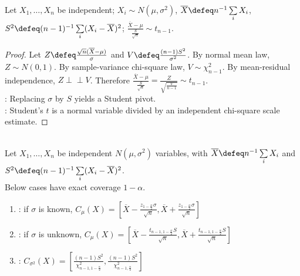 \begin{corollary} \label{cor:normal-student-t-pivot} \\
Let $X_1,\ldots,X_n$ be independent; $X_i\sim N(\mu,\sigma^2)$, $\overline{X}\defeq n^{-1}\sum\limits_iX_i$, $S^2\defeq(n-1)^{-1}\sum\limits_i(X_i-\overline{X})^2$; $\frac{\overline{X}-\mu}{\frac{S}{\sqrt n}}\sim t_{n-1}$.
\begin{proof} Let $Z\defeq\frac{\sqrt n(\overline{X}-\mu)}{\sigma}$ and $V\defeq\frac{(n-1)S^2}{\sigma^2}$. By normal mean law, $Z\sim N(0,1)$. By sample-variance chi-square law, $V\sim\chi^2_{n-1}$. By mean-residual independence, $Z\perp\!\!\!\perp V$. Therefore $\frac{\overline{X}-\mu}{\frac{S}{\sqrt n}}=\frac{Z}{\sqrt{\frac{V}{n-1}}}\sim t_{n-1}$.\\
: Replacing $\sigma$ by $S$ yields a Student pivot.\\
: Student's $t$ is a normal variable divided by an independent chi-square scale estimate.
\end{proof}
\end{corollary}

\begin{method} \label{meth:normal-mean-exact-confidence-intervals} \\
Let $X_1,\ldots,X_n$ be independent $N(\mu,\sigma^2)$ variables, with $\overline{X}\defeq n^{-1}\sum\limits_iX_i$ and $S^2\defeq(n-1)^{-1}\sum\limits_i(X_i-\overline{X})^2$.\\
Below cases have exact coverage $1-\alpha$.
\begin{enumerate}[label=(\roman*)]
\setlength{\itemsep}{0pt}
\item {}: if $\sigma$ is known, $C_\mu(X)=[\overline{X}-\frac{z_{1-\frac{\alpha}{2}}\sigma}{\sqrt n},\overline{X}+\frac{z_{1-\frac{\alpha}{2}}\sigma}{\sqrt n}]$
\item {}: if $\sigma$ is unknown, $C_\mu(X)=[\overline{X}-\frac{t_{n-1,1-\frac{\alpha}{2}}S}{\sqrt n},\overline{X}+\frac{t_{n-1,1-\frac{\alpha}{2}}S}{\sqrt n}]$
\item {}: $C_{\sigma^2}(X)=[\frac{(n-1)S^2}{\chi^2_{n-1,1-\frac{\alpha}{2}}},\frac{(n-1)S^2}{\chi^2_{n-1,\frac{\alpha}{2}}}]$
\end{enumerate}
\end{method}
